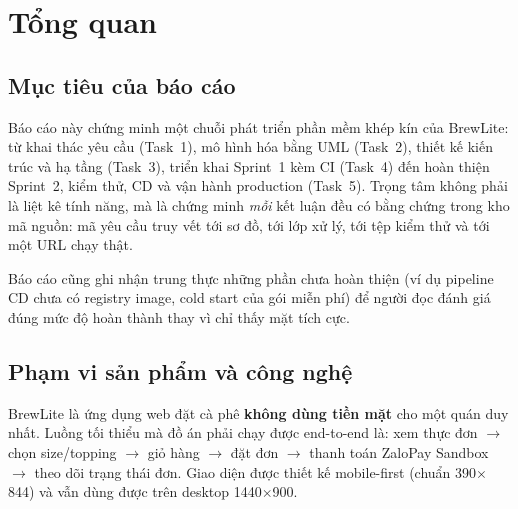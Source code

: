\section{Tổng quan}

\subsection{Mục tiêu của báo cáo}

Báo cáo này chứng minh một chuỗi phát triển phần mềm khép kín của BrewLite: từ khai thác
yêu cầu (Task~1), mô hình hóa bằng UML (Task~2), thiết kế kiến trúc và hạ tầng (Task~3),
triển khai Sprint~1 kèm CI (Task~4) đến hoàn thiện Sprint~2, kiểm thử, CD và vận hành
production (Task~5). Trọng tâm không phải là liệt kê tính năng, mà là chứng minh \emph{mỗi}
kết luận đều có bằng chứng trong kho mã nguồn: mã yêu cầu truy vết tới sơ đồ, tới lớp xử lý,
tới tệp kiểm thử và tới một URL chạy thật.

Báo cáo cũng ghi nhận trung thực những phần chưa hoàn thiện (ví dụ pipeline CD chưa có
registry image, cold start của gói miễn phí) để người đọc đánh giá đúng mức độ hoàn thành thay vì
chỉ thấy mặt tích cực.

\subsection{Phạm vi sản phẩm và công nghệ}

BrewLite là ứng dụng web đặt cà phê \textbf{không dùng tiền mặt} cho một quán duy nhất. Luồng
tối thiểu mà đồ án phải chạy được end-to-end là: xem thực đơn $\rightarrow$ chọn size/topping
$\rightarrow$ giỏ hàng $\rightarrow$ đặt đơn $\rightarrow$ thanh toán ZaloPay Sandbox
$\rightarrow$ theo dõi trạng thái đơn. Giao diện được thiết kế mobile-first (chuẩn 390$\times$844)
và vẫn dùng được trên desktop 1440$\times$900.

